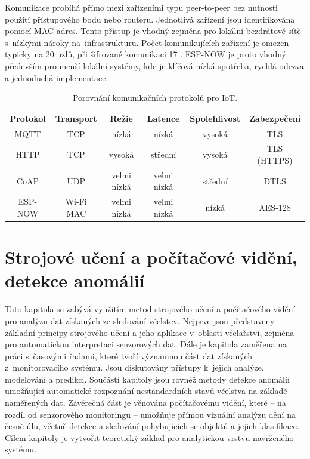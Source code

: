 Komunikace probíhá přímo mezi zařízeními typu peer-to-peer bez nutnosti použití přístupového bodu nebo routeru. Jednotlivá zařízení jsou identifikována pomocí MAC adres. Tento přístup je vhodný zejména pro lokální bezdrátové sítě s~nízkými nároky na~infrastrukturu. Počet komunikujících zařízení je omezen typicky na 20 uzlů, při šifrované komunikaci 17 \cite{esp-nowDoc}. ESP-NOW je proto vhodný především pro menší lokální systémy, kde je klíčová nízká spotřeba, rychlá odezva a jednoduchá implementace.

\begin{table}[H]
    \centering
    \begin{tabular}{|c|c|c|c|c|c|}
    \hline
        \textbf{Protokol} & \textbf{Transport} & \textbf{Režie} & \textbf{Latence} & \textbf{Spolehlivost} & \textbf{Zabezpečení} \\
        \hline
        MQTT & TCP & nízká & nízká & vysoká & TLS \\
        \hline
        HTTP & TCP & vysoká & střední & vysoká & TLS (HTTPS) \\
        \hline
        CoAP & UDP & velmi nízká & velmi nízká & střední & DTLS \\
        \hline
        ESP-NOW & Wi-Fi MAC & velmi nízká & velmi nízká & nízká & AES-128 \\
        \hline
    \end{tabular}
    \caption{Porovnání komunikačních protokolů pro IoT.}
    \label{tab:porovnani_komunikace}
\end{table}

\chapter{Strojové učení a počítačové vidění, detekce anomálií}\label{sec:strojove_uceni}
Tato kapitola se zabývá využitím metod strojového učení a počítačového vidění pro analýzu dat získaných ze sledování včelstev. Nejprve jsou představeny základní principy strojového učení a jeho aplikace v~oblasti včelařství, zejména pro automatickou interpretaci senzorových dat. Dále je kapitola zaměřena na práci s~časovými řadami, které tvoří významnou část dat získaných z~monitorovacího systému. Jsou diskutovány přístupy k~jejich analýze, modelování a predikci. Součástí kapitoly jsou rovněž metody detekce anomálií umožňující automatické rozpoznání nestandardních stavů včelstva na základě naměřených dat. Závěrečná část je věnována počítačovému vidění, které -- na rozdíl od senzorového monitoringu -- umožňuje přímou vizuální analýzu dění na česně úlu, včetně detekce a sledování pohybujících se objektů a jejich klasifikace. Cílem kapitoly je vytvořit teoretický základ pro analytickou vrstvu navrženého systému.

